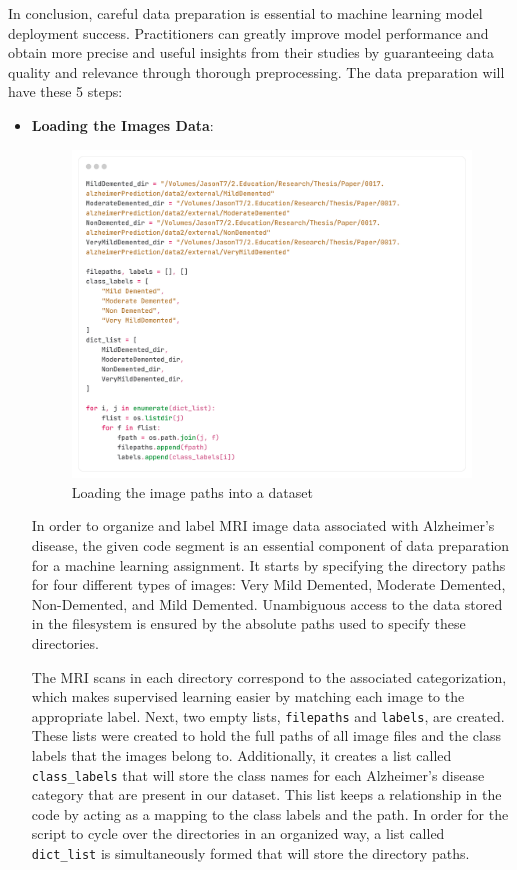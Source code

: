 \documentclass[12pt,onecolumn]{report}
\begin{document}
In conclusion, careful data preparation is essential to machine learning model deployment success. Practitioners can greatly improve model performance and obtain more precise and useful insights from their studies by guaranteeing data quality and relevance through thorough preprocessing. The data preparation will have these 5 steps:
\begin{itemize}
    \item \textbf{Loading the Images Data}:
    \begin{figure}[h!]
        \centering
        \includegraphics[width=1.0\columnwidth]{figures/loading_images.png}  %
        \caption{Loading the image paths into a dataset} %
        \label{fig:loading image paths a dataset} %
    \end{figure}
    In order to organize and label MRI image data associated with Alzheimer's disease, the given code segment is an essential component of data preparation for a machine learning assignment. It starts by specifying the directory paths for four different types of images: Very Mild Demented, Moderate Demented, Non-Demented, and Mild Demented. Unambiguous access to the data stored in the filesystem is ensured by the absolute paths used to specify these directories.

    The MRI scans in each directory correspond to the associated categorization, which makes supervised learning easier by matching each image to the appropriate label. Next, two empty lists, \texttt{filepaths} and \texttt{labels}, are created. These lists were created to hold the full paths of all image files and the class labels that the images belong to. Additionally, it creates a list called \texttt{class\_labels} that will store the class names for each Alzheimer's disease category that are present in our dataset. This list keeps a relationship in the code by acting as a mapping to the class labels and the path. In order for the script to cycle over the directories in an organized way, a list called \texttt{dict\_list} is simultaneously formed that will store the directory paths.


\end{itemize}
\end{document}
